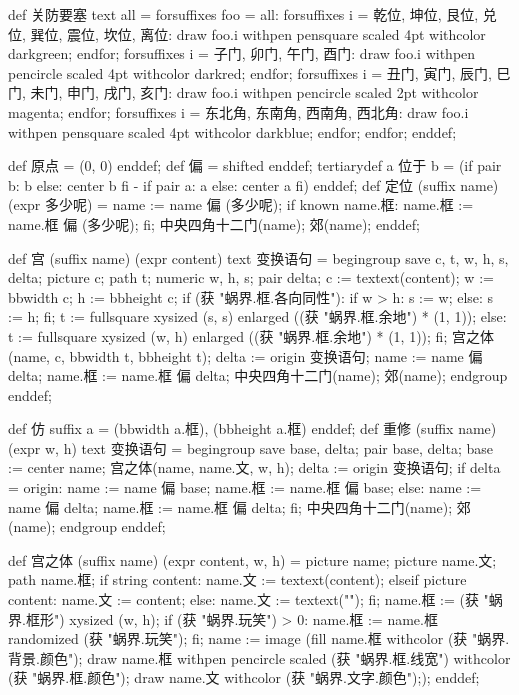 def 关防要塞 text all =
  forsuffixes foo = all:
    forsuffixes i = 乾位, 坤位, 艮位, 兑位, 巽位, 震位, 坎位, 离位:
      draw foo.i withpen pensquare scaled 4pt withcolor darkgreen;
    endfor;
    forsuffixes i = 子门, 卯门, 午门, 酉门:
      draw foo.i withpen pencircle scaled 4pt withcolor darkred;
    endfor;
    forsuffixes i = 丑门, 寅门, 辰门, 巳门, 未门, 申门, 戌门, 亥门:
      draw foo.i withpen pencircle scaled 2pt withcolor magenta;
    endfor;
    forsuffixes i = 东北角, 东南角, 西南角, 西北角:
      draw foo.i withpen pensquare scaled 4pt withcolor darkblue;
    endfor;
  endfor;
enddef;
\stopMPinclusions

\startMPinclusions[+]
def 原点 = (0, 0) enddef;
def 偏 = shifted enddef;
tertiarydef a 位于 b =
  (if pair b: b else: center b fi - if pair a: a else: center a fi)
enddef;
def 定位 (suffix name) (expr 多少呢) =
  name := name 偏 (多少呢);
  if known name.框:
    name.框 := name.框 偏 (多少呢);
  fi;
  中央四角十二门(name); 郊(name);
enddef;
\stopMPinclusions

\startMPinclusions[+]
def 宫 (suffix name) (expr content) text 变换语句 =
  begingroup
    save c, t, w, h, s, delta; 
    picture c; 
    path t; 
    numeric w, h, s; 
    pair delta;
    c := textext(content); 
    w := bbwidth c; 
    h := bbheight c;
    if (获 "蜗界.框.各向同性"):
      if w > h: s := w; else: s := h; fi;
      t := fullsquare xysized (s, s) enlarged ((获 "蜗界.框.余地") * (1, 1));
    else:
      t := fullsquare xysized (w, h) enlarged ((获 "蜗界.框.余地") * (1, 1));
    fi;
    宫之体(name, c, bbwidth t, bbheight t);
    delta := origin 变换语句;
    name := name 偏 delta;
    name.框 := name.框 偏 delta;
    中央四角十二门(name); 郊(name);
  endgroup
enddef;

def 仿 suffix a = (bbwidth a.框), (bbheight a.框) enddef;
def 重修 (suffix name) (expr w, h) text 变换语句 =
  begingroup
    save base, delta; pair base, delta; base := center name;
    宫之体(name, name.文, w, h);
    delta := origin 变换语句;
    if delta = origin:
      name := name 偏 base;
      name.框 := name.框 偏 base;
    else:
      name := name 偏 delta;
      name.框 := name.框 偏 delta;
    fi;
    中央四角十二门(name); 郊(name);
  endgroup
enddef;

def 宫之体 (suffix name) (expr content, w, h) =
  picture name; picture name.文; path name.框; 
  if string content:
    name.文 := textext(content);
  elseif picture content:
    name.文 := content;
  else:
    name.文 := textext("");
  fi;
  name.框 := (获 "蜗界.框形") xysized (w, h);
  if (获 "蜗界.玩笑") > 0: name.框 := name.框 randomized (获 "蜗界.玩笑"); fi;
  name := image (fill name.框 withcolor (获 "蜗界.背景.颜色");
                 draw name.框 withpen pencircle scaled (获 "蜗界.框.线宽")
                         withcolor (获 "蜗界.框.颜色");
                 draw name.文 withcolor (获 "蜗界.文字.颜色"););
enddef;
\stopMPinclusions

